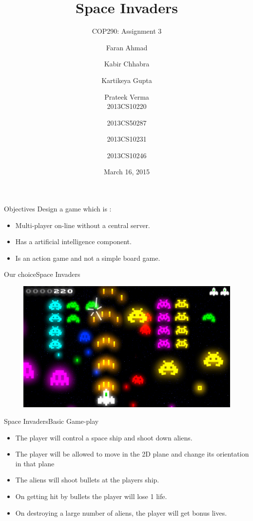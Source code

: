 \documentclass{beamer}
\title[COP 290]{Space Invaders}
\subtitle{COP290: Assignment 3}
\author[Faran \and Kabir \and Kartikeya \and Prateek]{Faran Ahmad \and Kabir Chhabra \and Kartikeya Gupta \and Prateek Verma \\
  2013CS10220 \and 2013CS50287 \and 2013CS10231 \and 2013CS10246}
\institute[IITD] %
{
  Department of Computer Science and Engineering\\
  IIT Delhi
}
\date{March 16, 2015}
\begin{document}
\begin{frame}
  \titlepage
\end{frame}

\begin{frame}{Objectives}{}
	Design a game which is :
	\begin{itemize}
		\item Multi-player on-line without a central server.
		\item Has a artificial intelligence component.
		\item Is an action game and not a simple board game.
	\end{itemize}
\end{frame}

\begin{frame}{Our choice}{Space Invaders}
    \begin{figure}[ht!]
      \centering
          \includegraphics[width=1.0\linewidth]{gameplay.png}
    \end{figure}
\end{frame}


\begin{frame}{Space Invaders}{Basic Game-play}
  \begin{itemize}
  	\item The player will control a space ship and shoot down aliens.
  	\item The player will be allowed to move in the 2D plane and change its orientation in that plane 
  	\item The aliens will shoot bullets at the players ship.
  	\item On getting hit by bullets the player will lose 1 life.
  	\item On destroying a large number of aliens, the player will get bonus lives.
  \end{itemize}
\end{frame}
\end{document}
